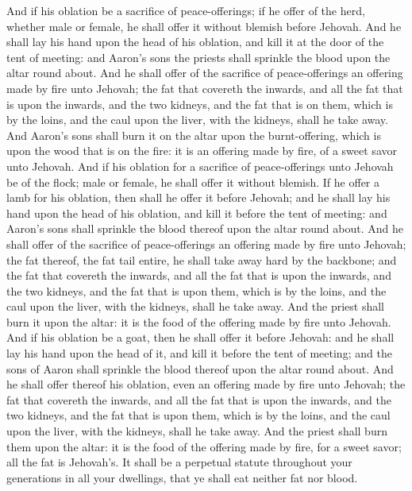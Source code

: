 And if his oblation be a sacrifice of peace-offerings; if he offer of the herd, whether male or female, he shall offer it without blemish before Jehovah. And he shall lay his hand upon the head of his oblation, and kill it at the door of the tent of meeting: and Aaron’s sons the priests shall sprinkle the blood upon the altar round about. And he shall offer of the sacrifice of peace-offerings an offering made by fire unto Jehovah; the fat that covereth the inwards, and all the fat that is upon the inwards, and the two kidneys, and the fat that is on them, which is by the loins, and the caul upon the liver, with the kidneys, shall he take away. And Aaron’s sons shall burn it on the altar upon the burnt-offering, which is upon the wood that is on the fire: it is an offering made by fire, of a sweet savor unto Jehovah.  And if his oblation for a sacrifice of peace-offerings unto Jehovah be of the flock; male or female, he shall offer it without blemish. If he offer a lamb for his oblation, then shall he offer it before Jehovah; and he shall lay his hand upon the head of his oblation, and kill it before the tent of meeting: and Aaron’s sons shall sprinkle the blood thereof upon the altar round about. And he shall offer of the sacrifice of peace-offerings an offering made by fire unto Jehovah; the fat thereof, the fat tail entire, he shall take away hard by the backbone; and the fat that covereth the inwards, and all the fat that is upon the inwards, and the two kidneys, and the fat that is upon them, which is by the loins, and the caul upon the liver, with the kidneys, shall he take away. And the priest shall burn it upon the altar: it is the food of the offering made by fire unto Jehovah.  And if his oblation be a goat, then he shall offer it before Jehovah: and he shall lay his hand upon the head of it, and kill it before the tent of meeting; and the sons of Aaron shall sprinkle the blood thereof upon the altar round about. And he shall offer thereof his oblation, even an offering made by fire unto Jehovah; the fat that covereth the inwards, and all the fat that is upon the inwards, and the two kidneys, and the fat that is upon them, which is by the loins, and the caul upon the liver, with the kidneys, shall he take away. And the priest shall burn them upon the altar: it is the food of the offering made by fire, for a sweet savor; all the fat is Jehovah’s. It shall be a perpetual statute throughout your generations in all your dwellings, that ye shall eat neither fat nor blood. 

